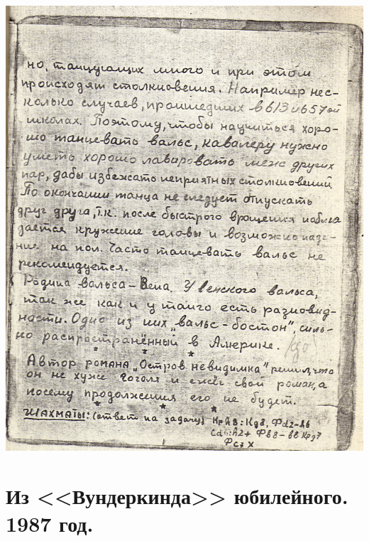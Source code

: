 \newpage

\noindent
\includegraphics[width=\textwidth]{inc/Vynd/Vynd013}

\section*{Из <<Вундеркинда>> юбилейного. 1987 год.}

